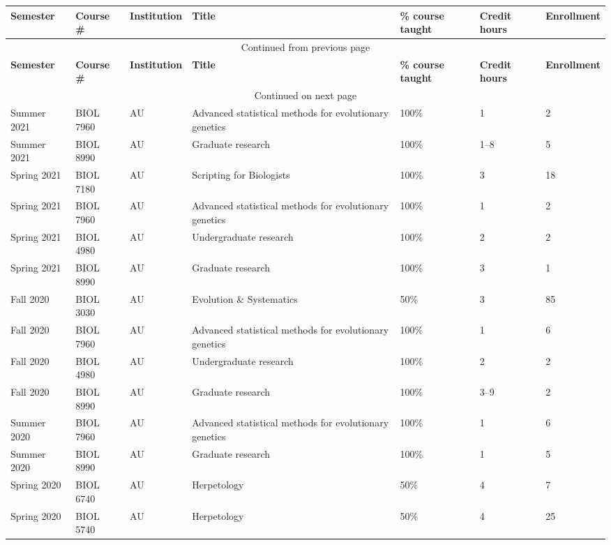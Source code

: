 {\sffamily\small
{}
\begin{longtable}[l]{ p{0.79in} p{0.65in} p{0.60in} p{1.7in} p{0.58in} p{0.34in} p{0.70in} }
    \hline
    \textbf{Semester} & \textbf{Course \#} & \textbf{Institution} & \textbf{Title} & \textbf{\% course taught} & \textbf{Credit hours} & \textbf{Enrollment} \\
    \hline
    \endfirsthead
    \multicolumn{7}{c}{{Continued from previous page}} \\
    \hline
    \textbf{Semester} & \textbf{Course \#} & \textbf{Institution} & \textbf{Title} & \textbf{\% course taught} & \textbf{Credit hours} & \textbf{Enrollment} \\
    \hline
    \endhead
    \hline \multicolumn{7}{c}{{Continued on next page}} \\
    \endfoot
    \hline
    \endlastfoot
    Summer 2021 & BIOL 7960 & AU & Advanced statistical methods for evolutionary genetics & 100\% & 1 & 2 \\
    Summer 2021 & BIOL 8990 & AU & Graduate research & 100\% & 1--8 & 5 \\ 
    Spring 2021 & BIOL 7180 & AU & Scripting for Biologists & 100\% & 3 & 18 \\
    Spring 2021 & BIOL 7960 & AU & Advanced statistical methods for evolutionary genetics & 100\% & 1 & 2 \\
    Spring 2021 & BIOL 4980 & AU & Undergraduate research & 100\% & 2 & 2 \\ 
    Spring 2021 & BIOL 8990 & AU & Graduate research & 100\% & 3 & 1 \\ 
    Fall 2020 & BIOL 3030 & AU & Evolution \& Systematics & 50\% & 3 & 85 \\
    Fall 2020 & BIOL 7960 & AU & Advanced statistical methods for evolutionary genetics & 100\% & 1 & 6 \\
    Fall 2020 & BIOL 4980 & AU & Undergraduate research & 100\% & 2 & 2 \\ 
    Fall 2020 & BIOL 8990 & AU & Graduate research & 100\% & 3--9 & 2 \\ 
    Summer 2020 & BIOL 7960 & AU & Advanced statistical methods for evolutionary genetics & 100\% & 1 & 6 \\
    Summer 2020 & BIOL 8990 & AU & Graduate research & 100\% & 1 & 5 \\ 
    Spring 2020 & BIOL 6740 & AU & Herpetology & 50\% & 4 & 7 \\
    Spring 2020 & BIOL 5740 & AU & Herpetology & 50\% & 4 & 25 \\

\end{longtable}}
